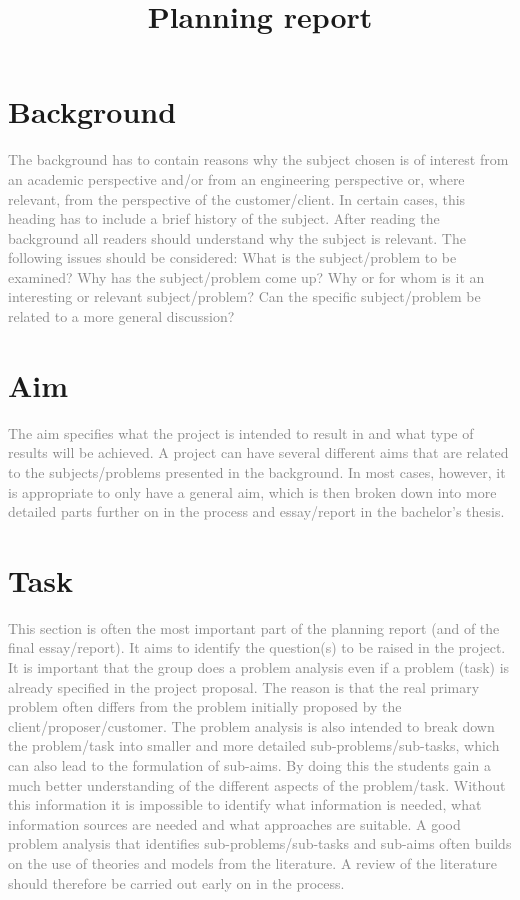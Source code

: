 \documentclass[12pt,a4paper]{article}
\title{Planning report}
\begin{document}
\maketitle
\section{Background}
\textcolor{gray}{
The background has to contain reasons why the subject chosen is of interest from an
academic perspective and/or from an engineering perspective or, where relevant, from the
perspective of the customer/client. In certain cases, this heading has to include a brief
history of the subject. After reading the background all readers should understand why the
subject is relevant. The following issues should be considered:
What is the subject/problem to be examined? Why has the subject/problem come up? Why
or for whom is it an interesting or relevant subject/problem? Can the specific
subject/problem be related to a more general discussion?
}
\section{Aim}
\textcolor{gray}{
The aim specifies what the project is intended to result in and what type of results will be
achieved. A project can have several different aims that are related to the subjects/problems
presented in the background. In most cases, however, it is appropriate to only have a
general aim, which is then broken down into more detailed parts further on in the process
and essay/report in the bachelor’s thesis.
}
\section{Task}
\textcolor{gray}{
This section is often the most important part of the planning report (and of the final
essay/report). It aims to identify the question(s) to be raised in the project. It is important
that the group does a problem analysis even if a problem (task) is already specified in the
project proposal. The reason is that the real primary problem often differs from the problem
initially proposed by the client/proposer/customer. The problem analysis is also intended to
break down the problem/task into smaller and more detailed sub-problems/sub-tasks, which
can also lead to the formulation of sub-aims. By doing this the students gain a much better
understanding of the different aspects of the problem/task. Without this information it is
impossible to identify what information is needed, what information sources are needed and
what approaches are suitable.
A good problem analysis that identifies sub-problems/sub-tasks and sub-aims often builds
on the use of theories and models from the literature. A review of the literature should
therefore be carried out early on in the process.
}
\end{document}
